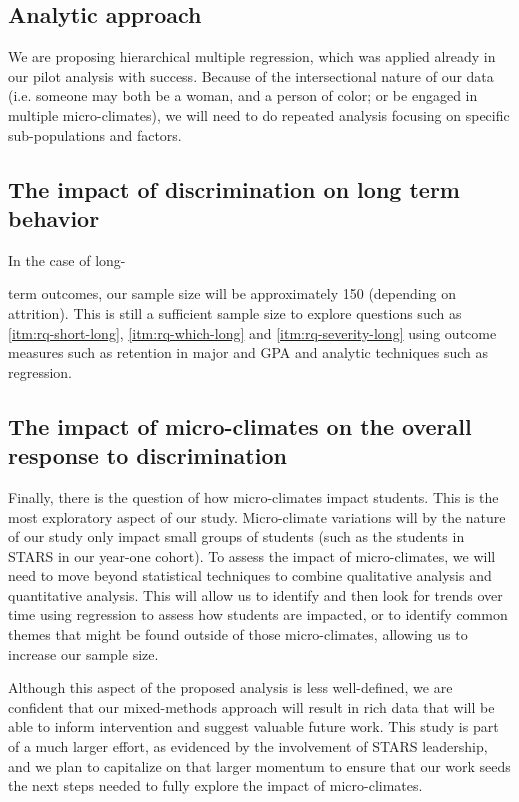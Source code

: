 \subsection{Analytic approach}
We are proposing hierarchical multiple regression, which was applied already in our pilot analysis with success. Because of the intersectional nature of our data (i.e. someone may both be a woman, and a person of color; or be engaged in multiple micro-climates), we will need to do repeated analysis focusing on specific sub-populations and factors. 


\subsection{The impact of discrimination on long term behavior}
In the case of long-

term outcomes, our sample size will be approximately 150 (depending on attrition). This is still a sufficient sample size to explore questions such as \ref{itm:rq-short-long}, \ref{itm:rq-which-long} and \ref{itm:rq-severity-long} using outcome measures such as retention in major and GPA and analytic techniques such as regression. 

\subsection{The impact of micro-climates on the overall response to discrimination}
Finally, there is the question of how micro-climates impact students. This is the most exploratory aspect of our study. Micro-climate variations will by the nature of our study only impact small groups of students (such as the \XXFILLIN students in STARS in our year-one cohort). To assess the impact of micro-climates, we will need to move beyond statistical techniques to combine qualitative analysis and quantitative analysis. This will allow us to identify and then look for trends over time using regression to assess how students are impacted, or to identify common themes that might be found outside of those micro-climates, allowing us to increase our sample size.

Although this aspect of the proposed analysis is less well-defined, we are confident that our mixed-methods approach will result in rich data that will be able to inform intervention and suggest valuable future work. This study is part of a much larger effort, as evidenced by the involvement of STARS leadership, and we plan to capitalize on that larger momentum to ensure that our work seeds the next steps needed to fully explore the impact of micro-climates. 

